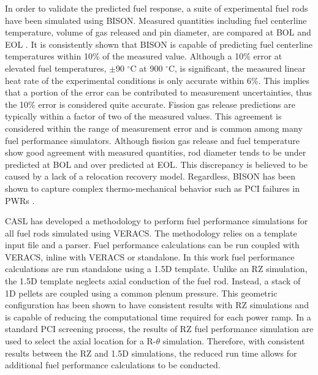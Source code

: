 \documentclass[edeposit,fullpage,11pt]{uiucthesis2009}
\begin{document}
In order to validate the predicted fuel response, a suite of experimental fuel rods have been simulated using BISON.
Measured quantities including fuel centerline temperature, volume of gas released and pin diameter, are compared at \gls{BOL} and \gls{EOL} \cite{williamson_bison_year}.
It is consistently shown that BISON is capable of predicting fuel centerline temperatures within 10\% of the measured value.
Although a 10\% error at elevated fuel temperatures, $\pm$90 $^\circ$C at 900 $^\circ$C, is significant, the measured linear heat rate of the experimental conditions is only accurate within 6\%. 
This implies that a portion of the error can be contributed to measurement uncertainties, thus the 10\% error is considered quite accurate.
Fission gas release predictions are typically within a factor of two of the measured values.
This agreement is considered within the range of measurement error and is common among many fuel performance simulators.
Although fission gas release and fuel temperature show good agreement with measured quantities, rod diameter tends to be under predicted at \gls{BOL} and over predicted at \gls{EOL}.
This discrepancy is believed to be caused by a lack of a relocation recovery model.
Regardless, BISON has been shown to capture complex thermo-mechanical behavior such as PCI failures in PWRs \cite{montgomery_advanced_2014,capps_pci_2016}.

\gls{CASL} has developed a methodology to perform fuel performance simulations for all fuel rods simulated using \gls{VERACS}.
The methodology relies on a template input file and a parser.
Fuel performance calculations can be run coupled with \gls{VERACS}, inline with \gls{VERACS} or standalone.
In this work fuel performance calculations are run standalone using a 1.5D template.
Unlike an RZ simulation, the 1.5D template neglects axial conduction of the fuel rod.
Instead, a stack of 1D pellets are coupled using a common plenum pressure.  
This geometric configuration has been shown to have consistent results with RZ simulations and is capable of reducing the computational time required for each power ramp. %
In a standard \gls{PCI} screening process, the results of RZ fuel performance simulation are used to select the axial location for a R-$\theta$ simulation.
Therefore, with consistent results between the RZ and 1.5D simulations, the reduced run time allows for additional fuel performance calculations to be conducted.



\end{document}
